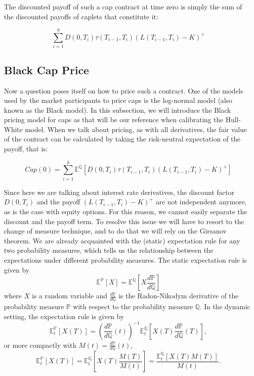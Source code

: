 \documentclass[titlepage, 12pt]{article}
\newcommand{\Q}{\mathbb{Q}}
\renewcommand{\P}{\mathbb{P}}
\newcommand{\condexpec}[2]{\mathbb{E}^\mathbb{#1}\left[#2\right]}
\newcommand{\condexpect}[3]{\mathbb{E}^\mathbb{#1}_{#2}\left[#3\right]}
\begin{document}
	The discounted payoff of such a cap contract at time zero is simply the sum of the discounted payoffs of caplets that constitute it:
	
	\begin{equation}
		\sum_{i=1}^b D(0,T_i)\tau(T_{i-1}, T_i)\left(L(T_{i-1}, T_i) - K\right)^+
	\end{equation}
	
	\subsection{Black Cap Price}
	
	Now a question poses itself on how to price such a contract. One of the models used by the market participants to price caps is the log-normal model (also known as the Black model). In this subsection, we will introduce the Black pricing model for caps as that will be our reference when calibrating the Hull-White model. When we talk about pricing, as with all derivatives, the fair value of the contract can be calculated by taking the risk-neutral expectation of the payoff, that is:
	
	\begin{equation}\label{eq:cap_price}
		Cap(0) = \sum_{i=1}^b \condexpec{Q}{D(0,T_i)\tau(T_{i-1}, T_i)\left(L(T_{i-1}, T_i) - K\right)^+}
	\end{equation}
	
	Since here we are talking about interest rate derivatives, the discount factor $D(0,T_i)$ and the payoff $(L(T_{i-1}, T_i) - K)^+$ are not independent anymore, as is the case with equity options. For this reason, we cannot easily separate the discount and the payoff term. To resolve this issue we will have to resort to the change of measure technique, and to do that we will rely on the Girsanov theorem. We are already acquainted with the (static) expectation rule for any two probability measures, which tells us the relationship between the expectations under different probability measures. The static expectation rule is given by
	\begin{equation}
		\condexpec{P}{X} = \condexpec{Q}{X\frac{d\P}{d\Q}}
	\end{equation}
	where $X$ is a random variable and $\frac{d\P}{d\Q}$ is the Radon-Nikodym derivative of the probability measure $\P$ with respect to the probability measure $\Q$. In the dynamic setting, the expectation rule is given by
	\begin{equation}
		\condexpect{P}{t}{X(T)} = \left(\frac{d\P}{d\Q}(t)\right)^{-1}\condexpect{Q}{t}{X(T)\frac{d\P}{d\Q}(T)},
	\end{equation}
	or more compactly with $M(t)=\frac{d\P}{d\Q}(t)$,
	\begin{equation}\label{eq:dynamic_exp_rule}
		\condexpect{P}{t}{X(T)} = \condexpect{Q}{t}{X(T)\frac{M(T)}{M(t)}} = \frac{\condexpect{Q}{t}{X(T)M(T)}}{M(t)}.
	\end{equation}
	
\end{document}
